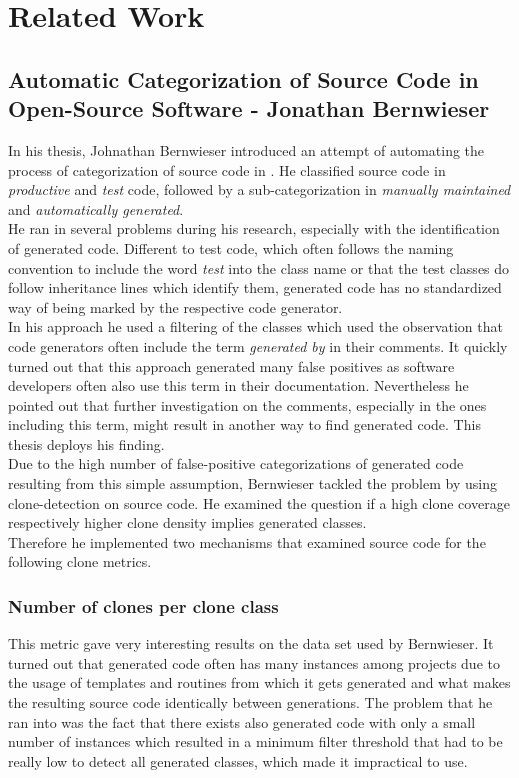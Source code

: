 \chapter{Related Work}\label{chapter:related}

\section{Automatic Categorization of Source Code in Open-Source Software - Jonathan Bernwieser}
In his thesis, Johnathan Bernwieser introduced an attempt of automating the process of categorization of source code in \cite{Bernwieser2014}. He classified source code in \textit{productive} and \textit{test} code, followed by a sub-categorization in \textit{manually maintained} and \textit{automatically generated}.\\
He ran in several problems during his research, especially with the identification of generated code. Different to test code, which often follows the naming convention to include the word \textit{test} into the class name or that the test classes do follow inheritance lines which identify them, generated code has no standardized way of being marked by the respective code generator.\\
In his approach he used a filtering of the classes which used the observation that code generators often include the term \textit{generated by} in their comments. It quickly turned out that this approach generated many false positives as software developers often also use this term in their documentation. Nevertheless he pointed out that further investigation on the comments, especially in the ones including this term, might result in another way to find generated code. This thesis deploys his finding. \\
Due to the high number of false-positive categorizations of generated code resulting from this simple assumption, Bernwieser tackled the problem by using clone-detection on source code. He examined the question if a high clone coverage respectively higher clone density implies generated classes.\\
Therefore he implemented two mechanisms that examined source code for the following clone metrics.

\subsection{Number of clones per clone class}
This metric gave very interesting results on the data set used by Bernwieser. It turned out that generated code often has many instances among projects due to the usage of templates and routines from which it gets generated and what makes the resulting source code identically between generations. The problem that he ran into was the fact that there exists also generated code with only a small number of instances which resulted in a minimum filter threshold that had to be really low to detect all generated classes, which made it impractical to use.


